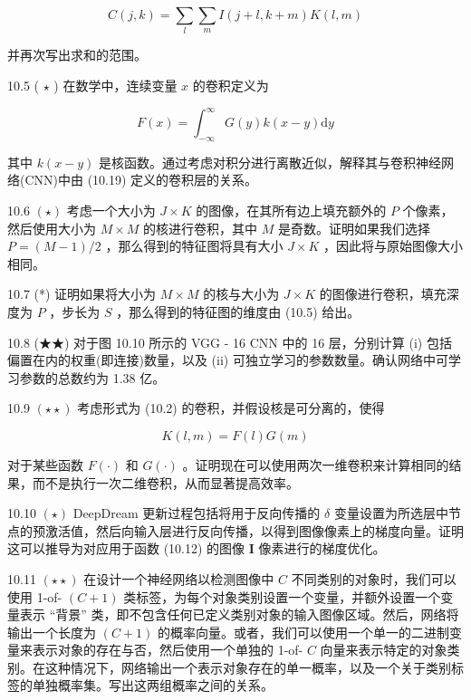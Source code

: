 \documentclass[10pt]{article}
\begin{document}
\[
C\left( {j,k}\right)  = \mathop{\sum }\limits_{l}\mathop{\sum }\limits_{m}I\left( {j + l,k + m}\right) K\left( {l,m}\right)  \tag{10.20}
\]

并再次写出求和的范围。

10.5 ( \(\star\) ) 在数学中，连续变量 \(x\) 的卷积定义为

\[
F\left( x\right)  = {\int }_{-\infty }^{\infty }G\left( y\right) k\left( {x - y}\right) \mathrm{d}y \tag{10.21}
\]

其中 \(k\left( {x - y}\right)\) 是核函数。通过考虑对积分进行离散近似，解释其与卷积神经网络(CNN)中由 (10.19) 定义的卷积层的关系。

10.6 \(\left( \star \right)\) 考虑一个大小为 \(J \times  K\) 的图像，在其所有边上填充额外的 \(P\) 个像素，然后使用大小为 \(M \times  M\) 的核进行卷积，其中 \(M\) 是奇数。证明如果我们选择 \(P = \left( {M - 1}\right) /2\) ，那么得到的特征图将具有大小 \(J \times  K\) ，因此将与原始图像大小相同。

10.7 (*) 证明如果将大小为 \(M \times  M\) 的核与大小为 \(J \times  K\) 的图像进行卷积，填充深度为 \(P\) ，步长为 \(S\) ，那么得到的特征图的维度由 (10.5) 给出。

10.8 (★★) 对于图 10.10 所示的 VGG - 16 CNN 中的 16 层，分别计算 (i) 包括偏置在内的权重(即连接)数量，以及 (ii) 可独立学习的参数数量。确认网络中可学习参数的总数约为 1.38 亿。

10.9 \(\left( {\star  \star  }\right)\) 考虑形式为 (10.2) 的卷积，并假设核是可分离的，使得

\[
K\left( {l,m}\right)  = F\left( l\right) G\left( m\right)  \tag{10.22}
\]

对于某些函数 \(F\left( \cdot \right)\) 和 \(G\left( \cdot \right)\) 。证明现在可以使用两次一维卷积来计算相同的结果，而不是执行一次二维卷积，从而显著提高效率。

10.10 \(\left( \star \right)\) DeepDream 更新过程包括将用于反向传播的 \(\delta\) 变量设置为所选层中节点的预激活值，然后向输入层进行反向传播，以得到图像像素上的梯度向量。证明这可以推导为对应用于函数 (10.12) 的图像 \(\mathbf{I}\) 像素进行的梯度优化。

10.11 \(\left( {\star  \star  }\right)\) 在设计一个神经网络以检测图像中 \(C\) 不同类别的对象时，我们可以使用 1-of- \(\left( {C + 1}\right)\) 类标签，为每个对象类别设置一个变量，并额外设置一个变量表示 “背景” 类，即不包含任何已定义类别对象的输入图像区域。然后，网络将输出一个长度为 \(\left( {C + 1}\right)\) 的概率向量。或者，我们可以使用一个单一的二进制变量来表示对象的存在与否，然后使用一个单独的 1-of- \(C\) 向量来表示特定的对象类别。在这种情况下，网络输出一个表示对象存在的单一概率，以及一个关于类别标签的单独概率集。写出这两组概率之间的关系。
\end{document}
